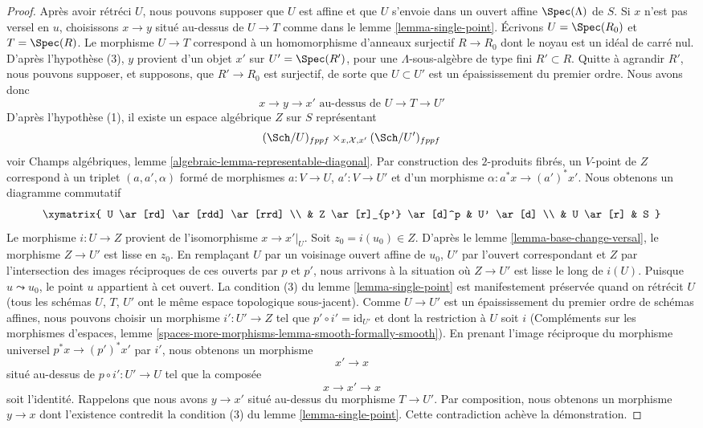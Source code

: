 \begin{proof}
Après avoir rétréci $U$, nous pouvons supposer que $U$ est affine et que $U$ s'envoie
dans un ouvert affine $\Spec(\Lambda)$ de $S$. Si $x$ n'est pas versel en $u$,
choisissons $x \to y$ situé au-dessus de $U \to T$ comme dans le lemme
\ref{lemma-single-point}. Écrivons $U = \Spec(R_0)$ et $T = \Spec(R)$. Le
morphisme $U \to T$ correspond à un homomorphisme d'anneaux surjectif
$R \to R_0$ dont le noyau est un idéal de carré nul. D'après l'hypothèse (3),
$y$ provient d'un objet $x'$ sur $U' = \Spec(R')$, pour une
$\Lambda$-sous-algèbre de type fini $R' \subset R$. Quitte à agrandir $R'$,
nous pouvons supposer, et supposons, que $R' \to R_0$ est surjectif, de sorte
que $U \subset U'$ est un épaississement du premier ordre. Nous avons donc
$$
x \to y \to x'
\text{ au-dessus de }
U \to T \to U'
$$
D'après l'hypothèse (1), il existe un espace algébrique $Z$ sur $S$ représentant
$$
(\Sch/U)_{fppf} \times_{x, \mathcal{X}, x'} (\Sch/U')_{fppf}
$$
voir Champs algébriques, lemme \ref{algebraic-lemma-representable-diagonal}.
Par construction des $2$-produits fibrés, un $V$-point de $Z$
correspond à un triplet $(a, a', \alpha)$ formé de morphismes
$a : V \to U$, $a' : V \to U'$ et d'un morphisme
$\alpha : a^*x \to (a')^*x'$. Nous obtenons un diagramme commutatif
$$
\xymatrix{
U \ar[rd] \ar[rdd] \ar[rrd] \\
& Z \ar[r]_{p'} \ar[d]^p & U' \ar[d] \\
& U \ar[r] & S
}
$$
Le morphisme $i : U \to Z$ provient de l'isomorphisme $x \to x'|_U$. Soit
$z_0 = i(u_0) \in Z$. D'après le lemme \ref{lemma-base-change-versal}, le
morphisme $Z \to U'$ est lisse en $z_0$. En remplaçant $U$ par un voisinage
ouvert affine de $u_0$, $U'$ par l'ouvert correspondant et $Z$ par
l'intersection des images réciproques de ces ouverts par $p$ et $p'$, nous
arrivons à la situation où $Z \to U'$ est lisse le long de $i(U)$. Puisque
$u \leadsto u_0$, le point $u$ appartient à cet ouvert. La condition (3) du
lemme \ref{lemma-single-point} est manifestement préservée quand on rétrécit
$U$ (tous les schémas $U$, $T$, $U'$ ont le même espace topologique
sous-jacent). Comme $U \to U'$ est un épaississement du premier ordre de
schémas affines, nous pouvons choisir un morphisme $i' : U' \to Z$ tel que
$p' \circ i' = \text{id}_{U'}$ et dont la restriction à $U$ soit $i$
(Compléments sur les morphismes d'espaces, lemme
\ref{spaces-more-morphisms-lemma-smooth-formally-smooth}). En prenant l'image
réciproque du morphisme universel $p^*x \to (p')^*x'$ par $i'$, nous obtenons
un morphisme
$$
x' \to x
$$
situé au-dessus de $p \circ i' : U' \to U$ tel que la composée
$$
x \to x' \to x
$$
soit l'identité. Rappelons que nous avons $y \to x'$ situé au-dessus du
morphisme $T \to U'$. Par composition, nous obtenons un morphisme $y \to x$
dont l'existence contredit la condition (3) du lemme
\ref{lemma-single-point}. Cette contradiction achève la démonstration.
\end{proof}






